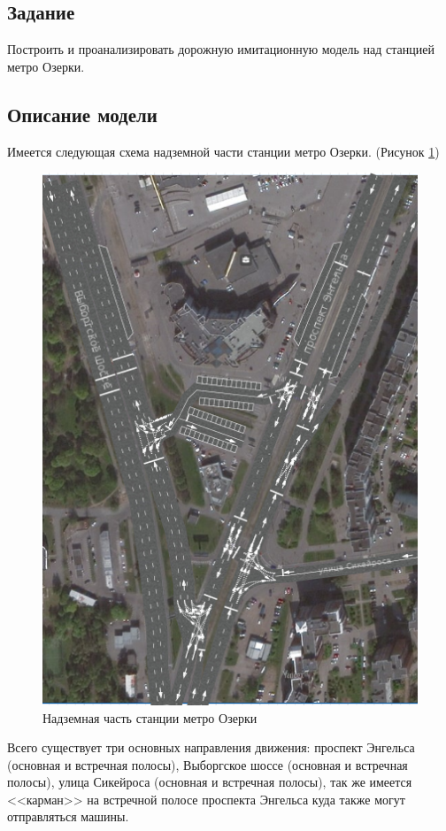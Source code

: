 \documentclass[14pt,fleqn]{extarticle}
\begin{document}
	\subsection*{Задание}
	Построить и проанализировать дорожную имитационную модель над станцией метро Озерки.

	\subsection*{Описание модели}
	Имеется следующая схема надземной части станции метро Озерки. (Рисунок \ref{fig:road_plan})
	\begin{figure}[h]
		\centering \includegraphics[scale=0.5]{road_plan}
		\caption{Надземная часть станции метро Озерки}
		\label{fig:road_plan}
	\end{figure}
	
	Всего существует три основных направления движения: проспект Энгельса (основная и встречная полосы), Выборгское шоссе (основная и встречная полосы), улица Сикейроса (основная и встречная полосы), так же имеется <<карман>> на встречной полосе проспекта Энгельса куда также могут отправляться машины.\\
	
\end{document}
